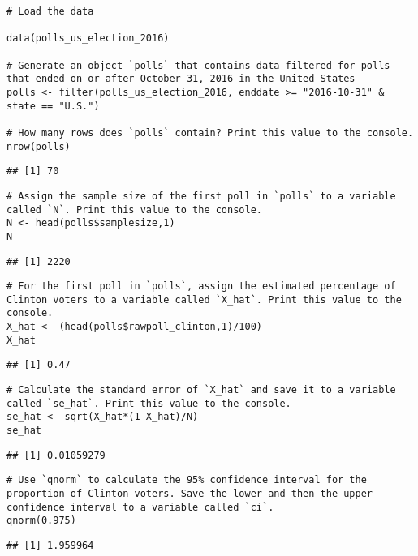 \documentclass[
]{article}
\begin{document}
\begin{verbatim}
# Load the data

data(polls_us_election_2016)

# Generate an object `polls` that contains data filtered for polls that ended on or after October 31, 2016 in the United States
polls <- filter(polls_us_election_2016, enddate >= "2016-10-31" & state == "U.S.")

# How many rows does `polls` contain? Print this value to the console.
nrow(polls)
\end{verbatim}

\begin{verbatim}
## [1] 70
\end{verbatim}

\begin{verbatim}
# Assign the sample size of the first poll in `polls` to a variable called `N`. Print this value to the console.
N <- head(polls$samplesize,1)
N
\end{verbatim}

\begin{verbatim}
## [1] 2220
\end{verbatim}

\begin{verbatim}
# For the first poll in `polls`, assign the estimated percentage of Clinton voters to a variable called `X_hat`. Print this value to the console.
X_hat <- (head(polls$rawpoll_clinton,1)/100)
X_hat
\end{verbatim}

\begin{verbatim}
## [1] 0.47
\end{verbatim}

\begin{verbatim}
# Calculate the standard error of `X_hat` and save it to a variable called `se_hat`. Print this value to the console.
se_hat <- sqrt(X_hat*(1-X_hat)/N)
se_hat
\end{verbatim}

\begin{verbatim}
## [1] 0.01059279
\end{verbatim}

\begin{verbatim}
# Use `qnorm` to calculate the 95% confidence interval for the proportion of Clinton voters. Save the lower and then the upper confidence interval to a variable called `ci`.
qnorm(0.975)
\end{verbatim}

\begin{verbatim}
## [1] 1.959964
\end{verbatim}
\end{document}
